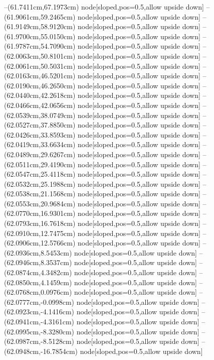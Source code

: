 --(61.7411cm,67.1973cm) node[sloped,pos=0.5,allow upside down]{\arrowIn}
--(61.9061cm,59.2465cm) node[sloped,pos=0.5,allow upside down]{\ArrowIn}
--(61.9149cm,58.9120cm) node[sloped,pos=0.5,allow upside down]{\arrowIn}
--(61.9700cm,55.0150cm) node[sloped,pos=0.5,allow upside down]{\ArrowIn}
--(61.9787cm,54.7090cm) node[sloped,pos=0.5,allow upside down]{\arrowIn}
--(62.0063cm,50.8101cm) node[sloped,pos=0.5,allow upside down]{\ArrowIn}
--(62.0061cm,50.5031cm) node[sloped,pos=0.5,allow upside down]{\arrowIn}
--(62.0163cm,46.5201cm) node[sloped,pos=0.5,allow upside down]{\ArrowIn}
--(62.0190cm,46.2650cm) node[sloped,pos=0.5,allow upside down]{\arrowIn}
--(62.0440cm,42.2618cm) node[sloped,pos=0.5,allow upside down]{\ArrowIn}
--(62.0466cm,42.0656cm) node[sloped,pos=0.5,allow upside down]{\arrowIn}
--(62.0539cm,38.0749cm) node[sloped,pos=0.5,allow upside down]{\ArrowIn}
--(62.0527cm,37.8850cm) node[sloped,pos=0.5,allow upside down]{\arrowIn}
--(62.0426cm,33.8593cm) node[sloped,pos=0.5,allow upside down]{\ArrowIn}
--(62.0419cm,33.6634cm) node[sloped,pos=0.5,allow upside down]{\arrowIn}
--(62.0489cm,29.6267cm) node[sloped,pos=0.5,allow upside down]{\ArrowIn}
--(62.0511cm,29.4190cm) node[sloped,pos=0.5,allow upside down]{\arrowIn}
--(62.0547cm,25.4118cm) node[sloped,pos=0.5,allow upside down]{\ArrowIn}
--(62.0532cm,25.1988cm) node[sloped,pos=0.5,allow upside down]{\arrowIn}
--(62.0538cm,21.1568cm) node[sloped,pos=0.5,allow upside down]{\ArrowIn}
--(62.0553cm,20.9684cm) node[sloped,pos=0.5,allow upside down]{\arrowIn}
--(62.0770cm,16.9301cm) node[sloped,pos=0.5,allow upside down]{\ArrowIn}
--(62.0793cm,16.7618cm) node[sloped,pos=0.5,allow upside down]{\arrowIn}
--(62.0910cm,12.7475cm) node[sloped,pos=0.5,allow upside down]{\ArrowIn}
--(62.0906cm,12.5766cm) node[sloped,pos=0.5,allow upside down]{\arrowIn}
--(62.0936cm,8.5453cm) node[sloped,pos=0.5,allow upside down]{\ArrowIn}
--(62.0946cm,8.3537cm) node[sloped,pos=0.5,allow upside down]{\arrowIn}
--(62.0874cm,4.3482cm) node[sloped,pos=0.5,allow upside down]{\ArrowIn}
--(62.0850cm,4.1459cm) node[sloped,pos=0.5,allow upside down]{\arrowIn}
--(62.0768cm,0.0976cm) node[sloped,pos=0.5,allow upside down]{\ArrowIn}
--(62.0777cm,-0.0998cm) node[sloped,pos=0.5,allow upside down]{\arrowIn}
--(62.0923cm,-4.1416cm) node[sloped,pos=0.5,allow upside down]{\ArrowIn}
--(62.0941cm,-4.3161cm) node[sloped,pos=0.5,allow upside down]{\arrowIn}
--(62.0995cm,-8.3280cm) node[sloped,pos=0.5,allow upside down]{\ArrowIn}
--(62.0987cm,-8.5128cm) node[sloped,pos=0.5,allow upside down]{\arrowIn}
--(62.0948cm,-16.7854cm) node[sloped,pos=0.5,allow upside down]{\ArrowIn}
